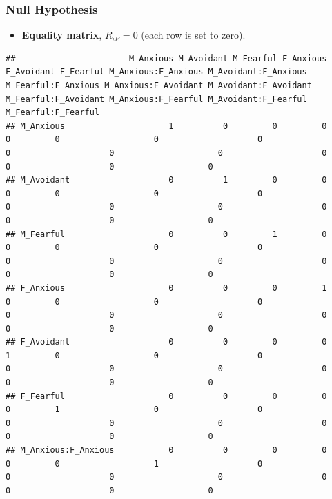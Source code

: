 \documentclass[
]{book}
\providecommand{\tightlist}{%
  \setlength{\itemsep}{0pt}\setlength{\parskip}{0pt}}
\begin{document}
\hypertarget{null-hypothesis}{%
\subsubsection*{Null Hypothesis}\label{null-hypothesis}}

\begin{itemize}
\tightlist
\item
  \textbf{Equality matrix}, \(R_{iE} = 0\) (each row is set to zero).
\end{itemize}

\begin{verbatim}
##                       M_Anxious M_Avoidant M_Fearful F_Anxious F_Avoidant F_Fearful M_Anxious:F_Anxious M_Avoidant:F_Anxious M_Fearful:F_Anxious M_Anxious:F_Avoidant M_Avoidant:F_Avoidant M_Fearful:F_Avoidant M_Anxious:F_Fearful M_Avoidant:F_Fearful M_Fearful:F_Fearful
## M_Anxious                     1          0         0         0          0         0                   0                    0                   0                    0                     0                    0                   0                    0                   0
## M_Avoidant                    0          1         0         0          0         0                   0                    0                   0                    0                     0                    0                   0                    0                   0
## M_Fearful                     0          0         1         0          0         0                   0                    0                   0                    0                     0                    0                   0                    0                   0
## F_Anxious                     0          0         0         1          0         0                   0                    0                   0                    0                     0                    0                   0                    0                   0
## F_Avoidant                    0          0         0         0          1         0                   0                    0                   0                    0                     0                    0                   0                    0                   0
## F_Fearful                     0          0         0         0          0         1                   0                    0                   0                    0                     0                    0                   0                    0                   0
## M_Anxious:F_Anxious           0          0         0         0          0         0                   1                    0                   0                    0                     0                    0                   0                    0                   0

\end{verbatim}
\end{document}
